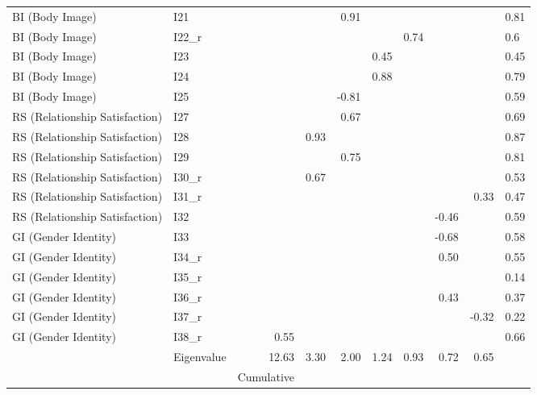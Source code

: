 \begin{table}[ht]
\begin{tabular}{llrrrrrrrl}
  BI (Body Image) & I21 &  &  & 0.91 &  &  &  &  & 0.81 \\ 
  BI (Body Image) & I22_r &  &  &  &  & 0.74 &  &  & 0.6 \\ 
  BI (Body Image) & I23 &  &  &  & 0.45 &  &  &  & 0.45 \\ 
  BI (Body Image) & I24 &  &  &  & 0.88 &  &  &  & 0.79 \\ 
  BI (Body Image) & I25 &  &  & -0.81 &  &  &  &  & 0.59 \\ 
  RS (Relationship Satisfaction) & I27 &  &  & 0.67 &  &  &  &  & 0.69 \\ 
  RS (Relationship Satisfaction) & I28 &  & 0.93 &  &  &  &  &  & 0.87 \\ 
  RS (Relationship Satisfaction) & I29 &  &  & 0.75 &  &  &  &  & 0.81 \\ 
  RS (Relationship Satisfaction) & I30_r &  & 0.67 &  &  &  &  &  & 0.53 \\ 
  RS (Relationship Satisfaction) & I31_r &  &  &  &  &  &  & 0.33 & 0.47 \\ 
  RS (Relationship Satisfaction) & I32 &  &  &  &  &  & -0.46 &  & 0.59 \\ 
  GI (Gender Identity) & I33 &  &  &  &  &  & -0.68 &  & 0.58 \\ 
  GI (Gender Identity) & I34_r &  &  &  &  &  & 0.50 &  & 0.55 \\ 
  GI (Gender Identity) & I35_r &  &  &  &  &  &  &  & 0.14 \\ 
  GI (Gender Identity) & I36_r &  &  &  &  &  & 0.43 &  & 0.37 \\ 
  GI (Gender Identity) & I37_r &  &  &  &  &  &  & -0.32 & 0.22 \\ 
  GI (Gender Identity) & I38_r & 0.55 &  &  &  &  &  &  & 0.66 \\ 
   & Eigenvalue & 12.63 & 3.30 & 2.00 & 1.24 & 0.93 & 0.72 & 0.65 &  \\ 
   & %
   & Cumulative %
   \hline
\end{tabular}
\end{table}

